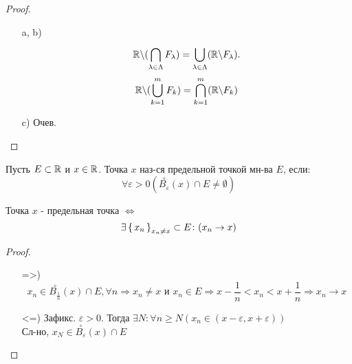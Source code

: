 \begin{proof}
\begin{itemize}
  \item [a, b) ] \[
  \mathbb{R} \backslash (\bigcap_{\lambda \in \Lambda}^{}F_\lambda) = \bigcup_{\lambda \in \Lambda}^{} (\mathbb{R} \backslash F_\lambda).
  \]
  \[
  \mathbb{R} \backslash (\bigcup_{k = 1}^{m} F_k) = \bigcap_{k = 1}^{m} (\mathbb{R} \backslash F_k)
  \]
\item [c)] Очев.
\end{itemize}
\end{proof}
\begin{definition}
Пусть $E \subset \mathbb{R}$ и $x \in \mathbb{R}$. Точка $x$ наз-ся предельной точкой мн-ва $E$, если:
\[
\forall \varepsilon > 0 (\overset{\circ}{B_{\varepsilon}}(x) \cap E \neq \emptyset)
\]
\end{definition}
\begin{lemma}
Точка $x$ - предельная точка $\iff$
\[
  \exists \set{x_n}_{x_n \neq x} \subset E \colon (x_n \rightarrow x)
\]
\end{lemma}
\begin{proof}
\begin{itemize}
  \item [=>)]
    \[
      x_n \in \overset{\circ}{B_{\frac{1}{n}}}(x) \cap E, \forall n \Rightarrow x_n \neq x \text{ и } x_n \in E \Rightarrow x - \frac{1}{n} < x_n < x + \frac{1}{n} \Rightarrow x_n \rightarrow x
    \]
  \item [<=)] Зафикс. $\varepsilon > 0$. Тогда $\exists N \colon \forall n \geq N (x_n \in (x -\varepsilon, x + \varepsilon))$ \\
    Сл-но, $x_N \in \overset{\circ}{B_{\varepsilon}}(x) \cap E$
\end{itemize}
\end{proof}

